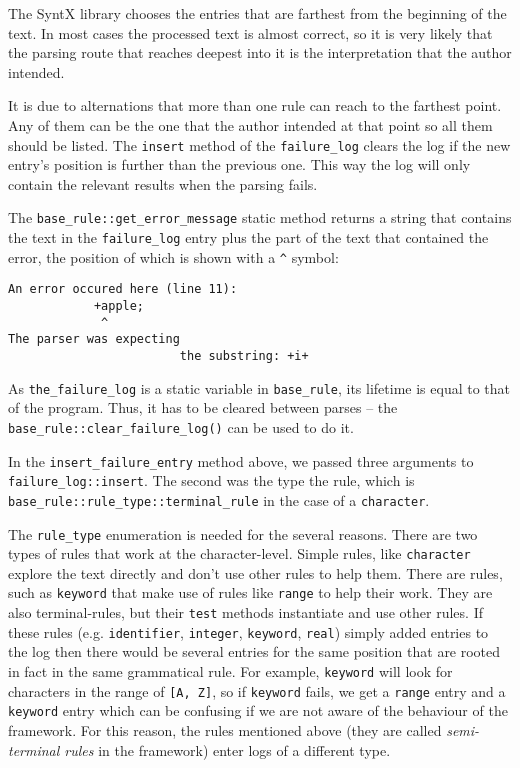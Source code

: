 \documentclass[12pt]{article}
\begin{document}
The SyntX library chooses the entries that are farthest from the beginning of the text. In most cases the
processed text is almost correct, so it is very likely that the parsing route that reaches deepest into it is
the interpretation that the author intended.

It is due to alternations that more than one rule can reach to the farthest point. Any of them can be the
one that the author intended at that point so all them should be listed. The \texttt{insert} method of the
\texttt{failure\_log} clears the log if the new entry's position is further than the previous one. This way
the log will only contain the relevant results when the parsing fails.

The \texttt{base\_rule::get\_error\_message} static method returns a string that contains the text in the
\texttt{failure\_log} entry plus the part of the text that contained the error, the position of which is shown
with a \texttt{\^} symbol:
\begin{center}
	\begin{minipage}[ht]{0.6\textwidth}
		\begin{lstlisting}[breaklines=true]
An error occured here (line 11):
			+apple;
			 ^
The parser was expecting
						the substring: +i+
		\end{lstlisting}
	\end{minipage}
\end{center}

As \texttt{the\_failure\_log} is a static variable in \texttt{base\_rule}, its lifetime is equal to that of the
program. Thus, it has to be cleared between parses -- the \texttt{base\_rule::clear\_failure\_log()} can be
used to do it.

In the \texttt{insert\_failure\_entry} method above, we passed three arguments to
\texttt{failure\_log::insert}. The second was the type the rule, which is
\texttt{base\_rule::rule\_type::terminal\_rule} in the case of a \texttt{character}.

The \texttt{rule\_type} enumeration is needed for the several reasons. There are two types of rules that work
at the character-level. Simple rules, like \texttt{character} explore the text directly and don't use other
rules to help them. There are rules, such as \texttt{keyword} that make use of rules like \texttt{range} to
help their work. They are also terminal-rules, but their \texttt{test} methods instantiate and use other
rules. If these rules (e.g. \texttt{identifier}, \texttt{integer}, \texttt{keyword}, \texttt{real}) simply
added entries to the log then there would be several entries for the same position that are rooted in fact in
the same grammatical rule. For example, \texttt{keyword} will look for characters in the range of \texttt{[A, Z]}, so
if \texttt{keyword} fails, we get a \texttt{range} entry and a \texttt{keyword} entry which can be confusing
if we are not aware of the behaviour of the framework. For this reason, the rules mentioned above (they are
called \emph{semi-terminal rules} in the framework) enter logs of a different type.
\end{document}
